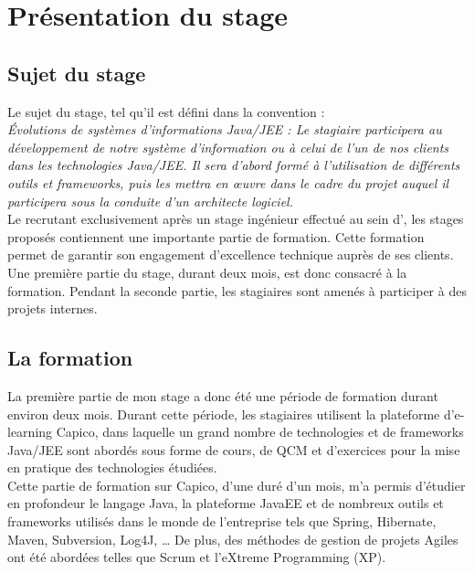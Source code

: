 \chapter{Présentation du stage}

\section{Sujet du stage}

Le sujet du stage, tel qu'il est défini dans la convention :\\

\emph{Évolutions de systèmes d'informations Java/JEE : Le stagiaire participera au développement de notre système d'information ou à celui de l'un de nos clients dans les technologies Java/JEE. Il sera d'abord formé à l'utilisation de différents outils et frameworks, puis les mettra en \oe{}uvre dans le cadre du projet auquel il participera sous la conduite d'un architecte logiciel.}\\

Le \excilysGroup{} recrutant exclusivement après un stage ingénieur effectué au sein d'\ebi{}, les stages proposés contiennent une importante partie de formation. Cette formation permet de garantir son engagement d'excellence technique auprès de ses clients. Une première partie du stage, durant deux mois, est donc consacré à la formation. Pendant la seconde partie, les stagiaires sont amenés à participer à des projets internes.

\section{La formation}

La première partie de mon stage a donc été une période de formation durant environ deux mois. Durant cette période, les stagiaires utilisent la plateforme d'e-learning Capico, dans laquelle un grand nombre de technologies et de frameworks Java/JEE sont abordés sous forme de cours, de QCM et d'exercices pour la mise en pratique des technologies étudiées.\\

Cette partie de formation sur Capico, d'une duré d'un mois, m'a permis d'étudier en profondeur le langage Java, la plateforme JavaEE et de nombreux outils et frameworks utilisés dans le monde de l'entreprise tels que Spring, Hibernate, Maven, Subversion, Log4J, \dots{} De plus, des méthodes de gestion de projets Agiles ont été abordées telles que Scrum et l'eXtreme Programming (XP).\\

